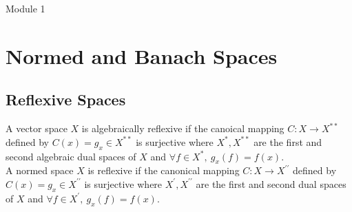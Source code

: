 
\setcounter{section}{3}
{\Large Module 1}
\section{Normed and Banach Spaces}
\setcounter{subsection}{5}
\subsection{Reflexive Spaces}
\begin{definition}[reflexive]
	A vector space $X$ is algebraically reflexive if the canoical mapping $C : X \to X^{\ast\ast}$ defined by $C(x) = g_x \in X^{\ast\ast}$ is surjective where $X^\ast, X^{\ast\ast}$ are the first and second algebraic dual spaces of $X$ and $\forall f \in X^\ast,\ g_x(f) = f(x)$.\\

	A normed space $X$ is reflexive if the canonical mapping $C : X \to X^{\prime\prime}$ defined by $C(x) = g_x \in X^{\prime\prime}$ is surjective where $X^\prime, X^{\prime\prime}$ are the first and second dual spaces of $X$ and $\forall f \in X^\prime,\ g_x(f) = f(x)$.
\end{definition}

